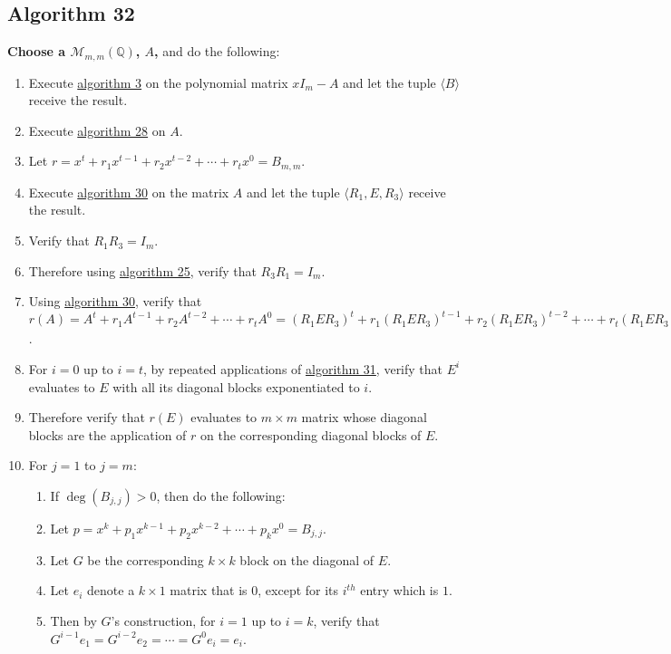\documentclass[twocolumn]{article}
\begin{document}
		\subsection{Algorithm 32}\label{sec:algorithm 32}
			\textbf{Choose a $\mathcal{M}_{m,m}(\mathbb{Q})$, $A$,} and do the following:
			\begin{enumerate}
				\item Execute \hyperref[sec:algorithm 3]{algorithm 3} on the polynomial matrix $xI_m-A$ and let the tuple $\langle B\rangle$ receive the result.
				\item Execute \hyperref[sec:algorithm 28]{algorithm 28} on $A$.
				\item Let $r=x^t+r_1x^{t-1}+r_2x^{t-2}+\cdots+r_tx^0=B_{m,m}$.
				\item Execute \hyperref[sec:algorithm 30]{algorithm 30} on the matrix $A$ and let the tuple $\langle R_1,E,R_3\rangle$ receive the result.
				\item Verify that $R_1R_3=I_m$.
				\item Therefore using \hyperref[sec:algorithm 25]{algorithm 25}, verify that $R_3R_1=I_m$.
				\item Using \hyperref[sec:algorithm 30]{algorithm 30}, verify that $r(A)=A^t+r_1A^{t-1}+r_2A^{t-2}+\cdots+r_tA^0=(R_1ER_3)^t+r_1(R_1ER_3)^{t-1}+r_2(R_1ER_3)^{t-2}+\cdots+r_t(R_1ER_3)^0=R_1(E^t+r_1E^{t-1}+r_2E^{t-2}+\cdots+r_tE^0)R_3=R_1r(E)R_3$.
				\item For $i=0$ up to $i=t$, by repeated applications of \hyperref[sec:algorithm 31]{algorithm 31}, verify that $E^i$ evaluates to $E$ with all its diagonal blocks exponentiated to $i$.
				\item Therefore verify that $r(E)$ evaluates to $m\times m$ matrix whose diagonal blocks are the application of $r$ on the corresponding diagonal blocks of $E$.
				\item For $j=1$ to $j=m$:
				\begin{enumerate}
					\item If $\deg(B_{j,j})>0$, then do the following:
					\item Let $p=x^k+p_1x^{k-1}+p_2x^{k-2}+\cdots+p_kx^0=B_{j,j}$.
					\item Let $G$ be the corresponding $k\times k$ block on the diagonal of $E$.
					\item Let $e_i$ denote a $k\times 1$ matrix that is $0$, except for its $i^{th}$ entry which is $1$.
					\item Then by $G$'s construction, for $i=1$ up to $i=k$, verify that $G^{i-1}e_1=G^{i-2}e_2=\cdots=G^{0}e_i=e_i$.

\end{enumerate}
\end{enumerate}
\end{document}
